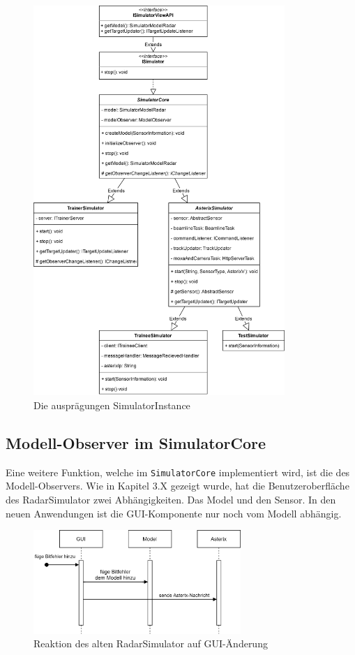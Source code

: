 \begin{figure}[p]
    \centering
    \includegraphics[width=0.85\textwidth]{content/assets/Kapitel4/SimulatorInstance.png}
    \caption{Die ausprägungen SimulatorInstance}
    \label{fig:SimulatorInstance}
\end{figure}

\subsection{Modell-Observer im SimulatorCore}
Eine weitere Funktion, welche im \texttt{SimulatorCore} implementiert wird, ist die des Modell-Observers. Wie in Kapitel 3.X gezeigt wurde, hat die Benutzeroberfläche des RadarSimulator zwei Abhängigkeiten. Das Model und den Sensor. In den neuen Anwendungen ist die GUI-Komponente nur noch vom Modell abhängig. 

\begin{figure}[ht]
    \centering
    \includegraphics[width=0.7\textwidth]{content/assets/Kapitel4/AlterSimulator.png}
    \caption{Reaktion des alten RadarSimulator auf GUI-Änderung}
    \label{fig:SimulatorAlt}
\end{figure}

